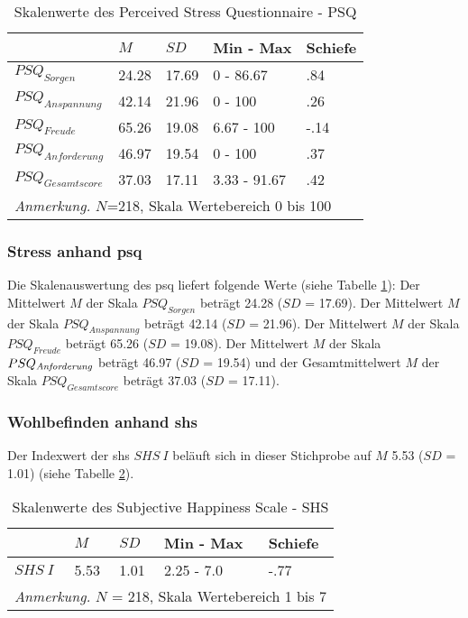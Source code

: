 \begin{table}[ht]
\centering
\captionsetup{margin=70pt, skip=5pt}
\caption{Skalenwerte des Perceived Stress Questionnaire - PSQ}
\label{table:PSQDeskriptiv}
\begin{tabular}{m{6em} m{3em}  m{3em}  m{5em} m{3em}} 
  \hline
  & $M$ & $SD$ & Min - Max & Schiefe\\
  \hline
  $PSQ_{Sorgen}$ & 24.28 & 17.69 & 0 - 86.67 & .84 \\
  $PSQ_{Anspannung}$ & 42.14 & 21.96 & 0 - 100 & .26\\
  $PSQ_{Freude}$ & 65.26 & 19.08 & 6.67 - 100 & -.14\\
  $PSQ_{Anforderung}$ & 46.97 & 19.54 & 0 - 100 & .37 \\
  $PSQ_{Gesamtscore}$ & 37.03 & 17.11 & 3.33 - 91.67 & .42\\
  \hline
  \multicolumn{5}{l}{\textit{Anmerkung.} $N$=218, Skala Wertebereich 0 bis 100}\\
\end{tabular}
\end{table}

\newpage 

\subsubsection{Stress anhand \acrshort{psq}}
Die Skalenauswertung des \acrfull{psq} liefert folgende Werte (siehe Tabelle \ref{table:PSQDeskriptiv}): Der Mittelwert $M$ der Skala $PSQ_{Sorgen}$ beträgt 24.28 ($SD$ = 17.69). Der Mittelwert $M$ der Skala $PSQ_{Anspannung}$ beträgt 42.14 ($SD$ = 21.96). Der Mittelwert $M$ der Skala $PSQ_{Freude}$ beträgt 65.26 ($SD$ = 19.08). Der Mittelwert $M$ der Skala $PSQ_{\text{\textit{Anforderung}}}$ beträgt 46.97 ($SD$ = 19.54) und der Gesamtmittelwert $M$ der Skala $PSQ_{Gesamtscore}$ beträgt 37.03 ($SD$ = 17.11).


\subsubsection{Wohlbefinden anhand \acrshort{shs}}
Der Indexwert der \acrfull{shs} $SHS~I$ beläuft sich in dieser Stichprobe auf $M$ 5.53 ($SD$ = 1.01) (siehe Tabelle \ref{table:SHSDeskriptiv}).

\begin{table}[ht]
\centering
\captionsetup{margin=80pt, skip=5pt}
\caption{Skalenwerte des Subjective Happiness Scale - SHS}
\label{table:SHSDeskriptiv}
\begin{tabular}{m{6em} m{3em}  m{3em}  m{5em} m{3em}} 
  \hline
  & $M$ & $SD$ & Min - Max & Schiefe\\
  \hline
  $SHS~I$ & 5.53 & 1.01 & 2.25 - 7.0 & -.77 \\
  \hline
  \multicolumn{5}{l}{\textit{Anmerkung.} $N$ = 218, Skala Wertebereich 1 bis 7}\\
\end{tabular}
\end{table}

